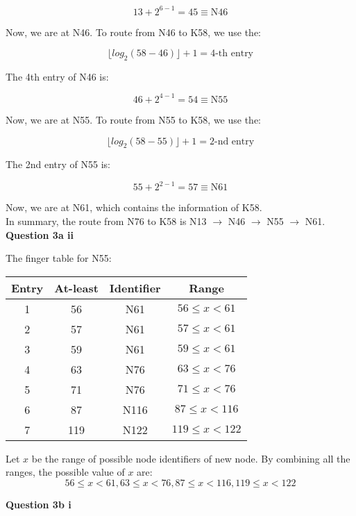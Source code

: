 \documentclass[11pt,a4paper]{report}
\begin{document}
\begin{multicols*}{2}
$$13 + 2^{6-1} = 45 \equiv \text{N46}$$

\noindent Now, we are at N46. To route from N46 to K58, we use the:

$$\lfloor log_2(58-46) \rfloor + 1 = 4\text{-th entry}$$

\noindent The 4th entry of N46 is:

$$46 + 2^{4-1} = 54 \equiv \text{N55}$$

\noindent Now, we are at N55. To route from N55 to K58, we use the:

$$\lfloor log_2(58-55) \rfloor + 1 = 2\text{-nd entry}$$

\noindent The 2nd entry of N55 is:

$$55 + 2^{2-1} = 57 \equiv \text{N61}$$

\noindent Now, we are at N61, which contains the information of K58. \\

\noindent In summary, the route from N76 to K58 is N13 $\rightarrow$ N46 $\rightarrow$ N55 $\rightarrow$ N61.\\

\noindent \textbf{Question 3a ii}

\noindent The finger table for N55:

\begin{center}
\begin{tabular}{|c|c|c|c|}
  \hline
  Entry & At-least & Identifier & Range\\ \hline
  1     & 56       & N61        & $56\le x <61$\\
  2     & 57       & N61        & $57\le x <61$\\
  3     & 59       & N61        & $59\le x <61$\\
  4     & 63       & N76        & $63\le x <76$\\
  5     & 71       & N76        & $71\le x <76$\\
  6     & 87       & N116       & $87\le x <116$\\
  7     & 119      & N122       & $119\le x <122$\\ \hline
\end{tabular}
\end{center}

\noindent Let $x$ be the range of possible node identifiers of new node. By combining all the ranges, the possible value of $x$ are:
$$56\le x <61, 63\le x <76,87\le x <116,119\le x <122$$

\noindent \textbf{Question 3b i}


\end{multicols*}
\end{document}
